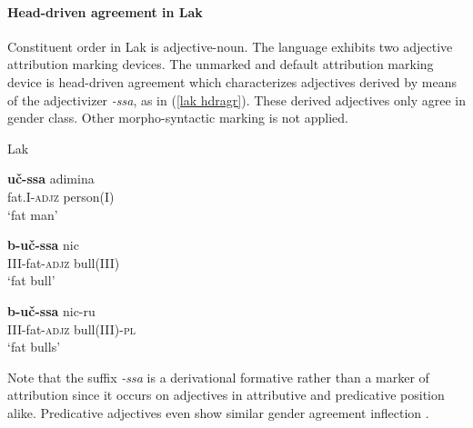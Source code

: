 \paragraph{Head-driven agreement in Lak}
Constituent order in Lak is adjective-noun. The language exhibits two adjective attribution marking devices. The unmarked and default attribution marking device is head-driven agreement which characterizes adjectives derived by means of the adjectivizer \mbox{\textit{-ssa}}, as in (\ref{lak hdragr}). These derived adjectives only agree in gender class. Other morpho-syntactic marking is not applied.
\begin{exe}
\ex 
\label{lak hdragr}
\rm{Lak \citep[48]{zirkov1955}} 
\begin{xlist}
\ex 
\gll	\textbf{uč-ssa} adimina\\
	fat.\textsc{I}-\textsc{adjz} person(\textsc{I})\\
\glt	‘fat man’

\ex
\gll	\textbf{b-uč-ssa} nic\\
	\textsc{III}-fat-\textsc{adjz} bull\textsc{(III)}\\
\glt	‘fat bull’

\ex
\gll	\textbf{b-uč-ssa} nic-ru\\
	\textsc{III}-fat-\textsc{adjz} bull\textsc{(III)}-\textsc{pl}\\
\glt	‘fat bulls’
\end{xlist}
\end{exe}
Note that the suffix \textit{-ssa} is a derivational formative rather than a marker of attribution since it occurs on adjectives in attributive and predicative position alike. Predicative adjectives even show similar gender agreement inflection \citep[45–51]{zirkov1955}.

